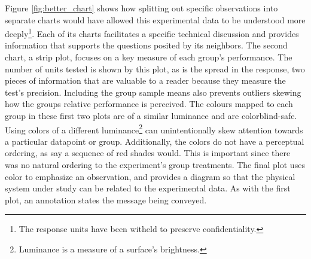 \documentclass[11pt,a4paper,article]{memoir} %
\begin{document}
   Figure \ref{fig:better_chart} shows how splitting out specific observations into separate charts would have allowed this experimental data to be understood more deeply\footnote{The response units have been witheld to preserve confidentiality.}. Each of its charts facilitates a specific technical discussion and provides information that supports the questions posited by its neighbors. The second chart, a strip plot, focuses on a key measure of each group's performance. The number of units tested is shown by this plot, as is the spread in the response, two pieces of information that are valuable to a reader because they measure the test's precision. Including the group sample means also prevents outliers skewing how the groups relative performance is perceived. The colours mapped to each group in these first two plots are of a similar luminance and are colorblind-safe. Using colors of a different luminance\footnote{Luminance is a measure of a surface's brightness.} can unintentionally skew attention towards a particular datapoint or group. Additionally, the colors do not have a perceptual ordering, as say a sequence of red shades would. This is important since there was no natural ordering to the experiment's group treatments. The final plot uses color to emphasize an observation, and provides a diagram so that the physical system under study can be related to the experimental data. As with the first plot, an annotation states the message being conveyed.
\end{document}
